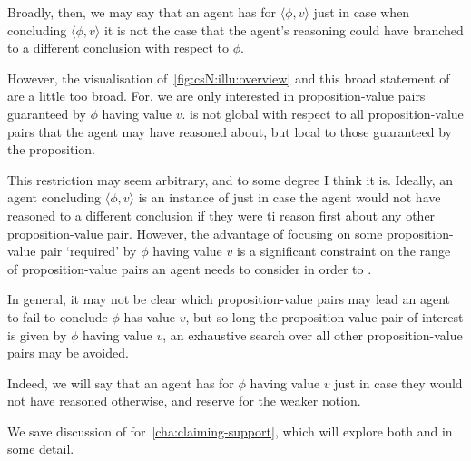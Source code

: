 \begin{note}
  Broadly, then, we may say that an agent has \csVed{} for \(\langle \phi,v \rangle\) just in case when concluding \(\langle \phi,v \rangle\) it is not the case that the agent's reasoning could have branched to a different conclusion with respect to \(\phi\).

  However, the visualisation of~\autoref{fig:csN:illu:overview} and this broad statement of \csN{} are a little too broad.
  For, we are only interested in proposition-value pairs guaranteed by \(\phi\) having value \(v\).
  \csN{} is not global with respect to all proposition-value pairs that the agent may have reasoned about, but local to those guaranteed by the proposition.

  This restriction may seem arbitrary, and to some degree I think it is.
  Ideally, an agent concluding \(\langle \phi,v \rangle\) is an instance of \csN{} just in case the agent would not have reasoned to a different conclusion if they were ti reason first about any other proposition-value pair.
  However, the advantage of focusing on some proposition-value pair `required' by \(\phi\) having value \(v\) is a significant constraint on the range of proposition-value pairs an agent needs to consider in order to \csN{}.

  In general, it may not be clear which proposition-value pairs may lead an agent to fail to conclude \(\phi\) has value \(v\), but so long the proposition-value pair of interest is given by \(\phi\) having value \(v\), an exhaustive search over all other proposition-value pairs may be avoided.

  Indeed, we will say that an agent has \emph{\support{}} for \(\phi\) having value \(v\) just in case they would not have reasoned otherwise, and reserve \emph{\claiming{}} \support{} for the weaker notion.

  We save discussion of \support{} for~\autoref{cha:claiming-support}, which will explore both \support{} and \csN{} in some detail.
\end{note}

